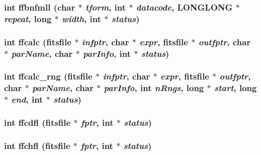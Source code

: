 \subsubsection{\setlength{\rightskip}{0pt plus 5cm}int ffbnfmll (char $\ast$ {\em tform}, int $\ast$ {\em datacode}, \bf{LONGLONG} $\ast$ {\em repeat}, long $\ast$ {\em width}, int $\ast$ {\em status})}\label{fitsio_8h_63407aabf5d249931c496d2b4029a188}


\subsubsection{\setlength{\rightskip}{0pt plus 5cm}int ffcalc (\bf{fitsfile} $\ast$ {\em infptr}, char $\ast$ {\em expr}, \bf{fitsfile} $\ast$ {\em outfptr}, char $\ast$ {\em par\-Name}, char $\ast$ {\em par\-Info}, int $\ast$ {\em status})}\label{fitsio_8h_c546ca394e9c86991b46a6f6c420f7bf}


\subsubsection{\setlength{\rightskip}{0pt plus 5cm}int ffcalc\_\-rng (\bf{fitsfile} $\ast$ {\em infptr}, char $\ast$ {\em expr}, \bf{fitsfile} $\ast$ {\em outfptr}, char $\ast$ {\em par\-Name}, char $\ast$ {\em par\-Info}, int {\em n\-Rngs}, long $\ast$ {\em start}, long $\ast$ {\em end}, int $\ast$ {\em status})}\label{fitsio_8h_fb304389717fe2041f1b59c7acc85249}


\subsubsection{\setlength{\rightskip}{0pt plus 5cm}int ffcdfl (\bf{fitsfile} $\ast$ {\em fptr}, int $\ast$ {\em status})}\label{fitsio_8h_e14237195c7eca6e7dd93690762d20db}


\subsubsection{\setlength{\rightskip}{0pt plus 5cm}int ffchfl (\bf{fitsfile} $\ast$ {\em fptr}, int $\ast$ {\em status})}\label{fitsio_8h_d12b5239c1ab6d90b8bfc43562fe1286}


